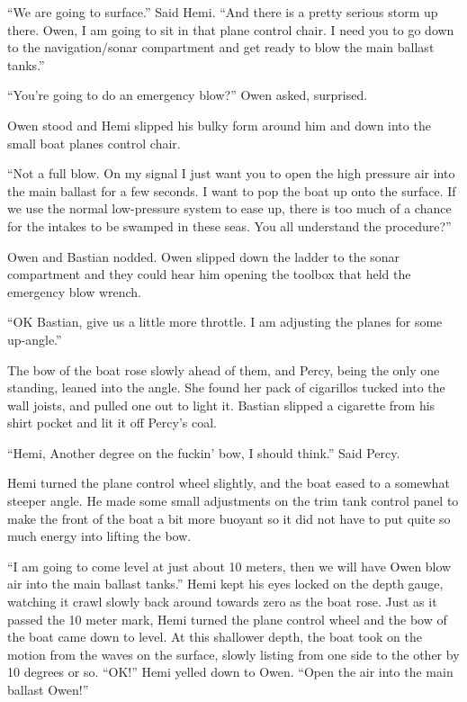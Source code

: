 \documentclass[
]{scrbook}
\begin{document}
``We are going to surface.'' Said Hemi. ``And there is a pretty serious
storm up there. Owen, I am going to sit in that plane control chair. I
need you to go down to the navigation/sonar compartment and get ready to
blow the main ballast tanks.''

``You're going to do an emergency blow?'' Owen asked, surprised.

Owen stood and Hemi slipped his bulky form around him and down into the
small boat planes control chair.

``Not a full blow. On my signal I just want you to open the high
pressure air into the main ballast for a few seconds. I want to pop the
boat up onto the surface. If we use the normal low-pressure system to
ease up, there is too much of a chance for the intakes to be swamped in
these seas. You all understand the procedure?''

Owen and Bastian nodded. Owen slipped down the ladder to the sonar
compartment and they could hear him opening the toolbox that held the
emergency blow wrench.

``OK Bastian, give us a little more throttle. I am adjusting the planes
for some up-angle.''

The bow of the boat rose slowly ahead of them, and Percy, being the only
one standing, leaned into the angle. She found her pack of cigarillos
tucked into the wall joists, and pulled one out to light it. Bastian
slipped a cigarette from his shirt pocket and lit it off Percy's coal.

``Hemi, Another degree on the fuckin' bow, I should think.'' Said Percy.

Hemi turned the plane control wheel slightly, and the boat eased to a
somewhat steeper angle. He made some small adjustments on the trim tank
control panel to make the front of the boat a bit more buoyant so it did
not have to put quite so much energy into lifting the bow.

``I am going to come level at just about 10 meters, then we will have
Owen blow air into the main ballast tanks.'' Hemi kept his eyes locked
on the depth gauge, watching it crawl slowly back around towards zero as
the boat rose. Just as it passed the 10 meter mark, Hemi turned the
plane control wheel and the bow of the boat came down to level. At this
shallower depth, the boat took on the motion from the waves on the
surface, slowly listing from one side to the other by 10 degrees or so.
``OK!'' Hemi yelled down to Owen. ``Open the air into the main ballast
Owen!''
\end{document}
